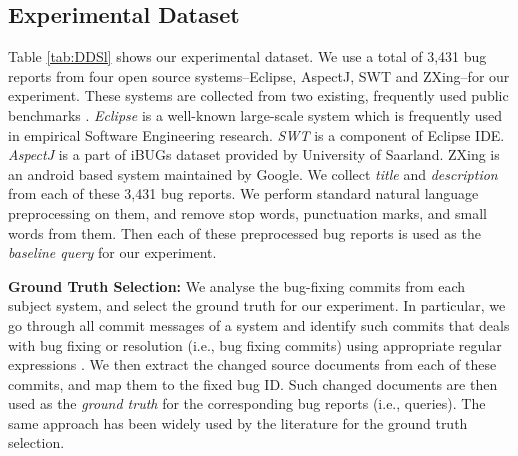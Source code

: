 \documentclass[conference]{IEEEtran}
\begin{document}
\subsection{Experimental Dataset}\label{sec:dataset}
Table \ref{tab:DDSl} shows our experimental dataset. We use a total of 3,431 bug reports from four open source systems--Eclipse, AspectJ, SWT and ZXing--for our experiment. These systems are collected from two existing, frequently used public benchmarks \cite{Jian,Saha}. 
\emph{Eclipse} is a well-known large-scale system which is frequently used in empirical Software Engineering research.
\emph{SWT} is a component of Eclipse IDE.
\emph{AspectJ} is a part of iBUGs dataset provided by University of Saarland. 
ZXing is an android based system maintained by Google. We collect \emph{title} and \emph{description} from each of these 3,431 bug reports. We perform standard natural language preprocessing on them, and remove stop words, punctuation marks, and small words from them. Then each of these preprocessed bug reports is used as the \emph{baseline query} for our experiment. 



\textbf{Ground Truth Selection:} We analyse the bug-fixing commits from each subject system, and select the ground truth for our experiment. In particular, we go through all commit messages of a system and identify such commits that deals with bug fixing or resolution (i.e., bug fixing commits) using appropriate regular expressions \cite{bugid}. We then extract the changed source documents from each of these commits, and map them to the fixed bug ID. Such changed documents are then used as the \emph{ground truth} for the corresponding bug reports (i.e., queries). The same approach has been widely used by the literature \cite{Saha2,Wang2,Jian} for the ground truth selection. 

 
\end{document}
